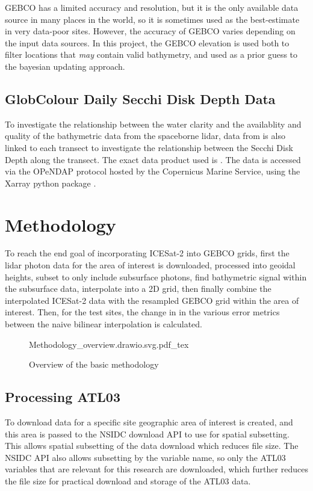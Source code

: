 GEBCO has a limited accuracy and resolution, but it is the only available data source in many places in the world, so it is sometimes used as the best-estimate in very data-poor sites. However, the accuracy of GEBCO varies depending on the input data sources. In this project, the GEBCO elevation is used both to filter locations that \emph{may} contain valid bathymetry, and used as a prior guess to the bayesian updating approach. 

\subsection{GlobColour Daily Secchi Disk Depth Data}

To investigate the relationship between the water clarity and the availablity and quality of the bathymetric data from the spaceborne lidar, data from \citeauthor{Garnesson2019} is also linked to each transect to investigate the relationship between the Secchi Disk Depth  along the transect. The exact data product used is \cite{dailysecchidata}. The data is accessed via the OPeNDAP protocol hosted by the Copernicus Marine Service, using the Xarray python package \parencite{hoyer_stephan_2022_6323468,hoyer2017xarray}.



\section{Methodology}


To reach the end goal of incorporating ICESat-2 into GEBCO grids, first the lidar photon data for the area of interest is downloaded, processed into geoidal heights, subset to only include subsurface photons, find bathymetric signal within the subsurface data, interpolate into a 2D grid, then finally combine the interpolated ICESat-2 data with the resampled GEBCO grid within the area of interest. Then, for the test sites, the change in in the various error metrics between the naive bilinear interpolation is calculated. 


\begin{figure}[h!]
    \centering
    {Methodology_overview.drawio.svg.pdf_tex}
    \caption{Overview of the basic methodology}
    \label{fig:methodology-overview}
\end{figure}

\subsection{Processing ATL03}
To download data for a specific site geographic area of interest is created, and this area is passed to the NSIDC download API to use for spatial subsetting. This allows spatial subsetting of the data download which reduces file size. The NSIDC API also allows subsetting by the variable name, so only the ATL03 variables that are relevant for this research are downloaded, which further reduces the file size for practical download and storage of the ATL03 data. 

